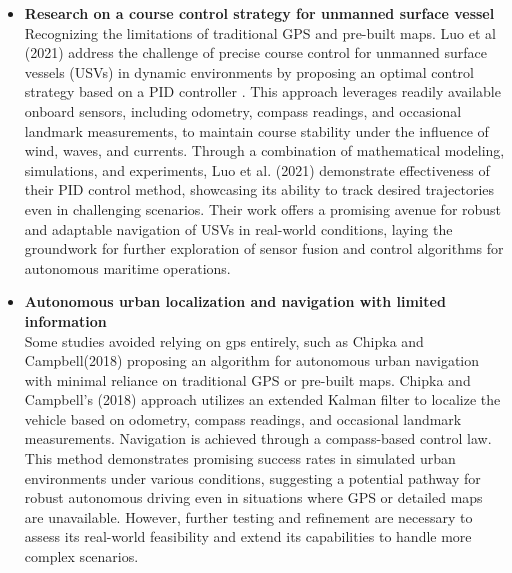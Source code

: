 \begin{itemize}
\item {\bf Research on a course control strategy for unmanned surface vessel} \\
Recognizing the limitations of traditional GPS and pre-built maps. Luo et al (2021) address the challenge of precise 
course control for unmanned surface vessels (USVs) in dynamic environments by proposing an optimal control strategy 
based on a PID controller . This approach leverages readily available onboard sensors, including odometry, compass 
readings, and occasional landmark measurements, to maintain course stability under the influence of wind, waves, and 
currents. Through a combination of mathematical modeling, simulations, and experiments, Luo et al. (2021) demonstrate 
effectiveness of their PID control method, showcasing its ability to track desired trajectories even in challenging 
scenarios. Their work offers a promising avenue for robust and adaptable navigation of USVs in real-world conditions, 
laying the groundwork for further exploration of sensor fusion and control algorithms for autonomous maritime operations.

\item {\bf Autonomous urban localization and navigation with limited information} \\
Some studies avoided relying on gps entirely, such as Chipka and Campbell(2018) proposing an algorithm for autonomous 
urban navigation with minimal reliance on traditional GPS or pre-built maps. Chipka and Campbell’s (2018) approach 
utilizes an extended Kalman filter to localize the vehicle based on odometry, compass readings, and occasional landmark 
measurements. Navigation is achieved through a compass-based control law. This method demonstrates promising success 
rates in simulated urban environments under various conditions, suggesting a potential pathway for robust autonomous 
driving even in situations where GPS or detailed maps are unavailable. However, further testing and refinement are 
necessary to assess its real-world feasibility and extend its capabilities to handle more complex scenarios.


\end{itemize}
